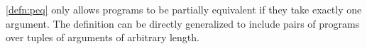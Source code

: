\autoref{defn:peq} only allows programs to be partially equivalent if
they take exactly one argument.
%
The definition can be directly generalized to include pairs of
programs over tuples of arguments of arbitrary length.

